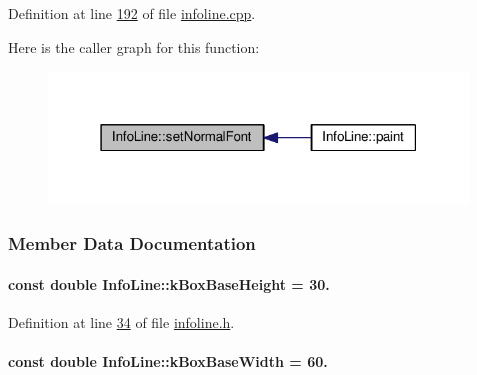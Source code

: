 Definition at line \hyperlink{infoline_8cpp_source_l00192}{192} of file \hyperlink{infoline_8cpp_source}{infoline.\+cpp}.



Here is the caller graph for this function\+:\nopagebreak
\begin{figure}[H]
\begin{center}
\leavevmode
\includegraphics[width=316pt]{class_info_line_a4d5084d616c878cb717e8445db0023c1_icgraph}
\end{center}
\end{figure}




\subsubsection{Member Data Documentation}
\hypertarget{class_info_line_ab50f47aa54c45def219859e9da3755e6}{}
\paragraph[{k\+Box\+Base\+Height}]{\setlength{\rightskip}{0pt plus 5cm}const double Info\+Line\+::k\+Box\+Base\+Height = 30.\hspace{0.3cm}{\ttfamily [static]}}\label{class_info_line_ab50f47aa54c45def219859e9da3755e6}


Definition at line \hyperlink{infoline_8h_source_l00034}{34} of file \hyperlink{infoline_8h_source}{infoline.\+h}.

\hypertarget{class_info_line_aad905589137b80ba75d9a1c49535eb1a}{}
\paragraph[{k\+Box\+Base\+Width}]{\setlength{\rightskip}{0pt plus 5cm}const double Info\+Line\+::k\+Box\+Base\+Width = 60.\hspace{0.3cm}{\ttfamily [static]}}\label{class_info_line_aad905589137b80ba75d9a1c49535eb1a}


